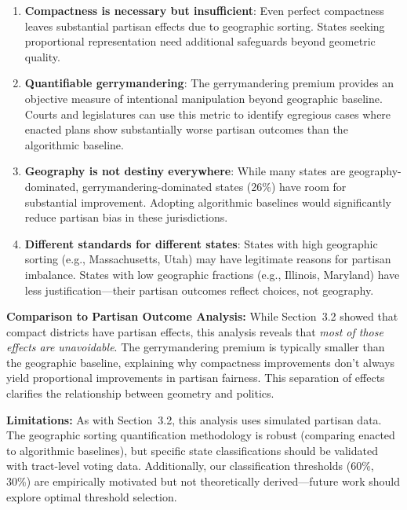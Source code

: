 \begin{enumerate}
    \item \textbf{Compactness is necessary but insufficient}: Even perfect compactness leaves substantial partisan effects due to geographic sorting. States seeking proportional representation need additional safeguards beyond geometric quality.

    \item \textbf{Quantifiable gerrymandering}: The gerrymandering premium provides an objective measure of intentional manipulation beyond geographic baseline. Courts and legislatures can use this metric to identify egregious cases where enacted plans show substantially worse partisan outcomes than the algorithmic baseline.

    \item \textbf{Geography is not destiny everywhere}: While many states are geography-dominated, gerrymandering-dominated states (26\%) have room for substantial improvement. Adopting algorithmic baselines would significantly reduce partisan bias in these jurisdictions.

    \item \textbf{Different standards for different states}: States with high geographic sorting (e.g., Massachusetts, Utah) may have legitimate reasons for partisan imbalance. States with low geographic fractions (e.g., Illinois, Maryland) have less justification—their partisan outcomes reflect choices, not geography.
\end{enumerate}

\textbf{Comparison to Partisan Outcome Analysis:} While Section~3.2 showed that compact districts have partisan effects, this analysis reveals that \textit{most of those effects are unavoidable}. The gerrymandering premium is typically smaller than the geographic baseline, explaining why compactness improvements don't always yield proportional improvements in partisan fairness. This separation of effects clarifies the relationship between geometry and politics.

\textbf{Limitations:} As with Section~3.2, this analysis uses simulated partisan data. The geographic sorting quantification methodology is robust (comparing enacted to algorithmic baselines), but specific state classifications should be validated with tract-level voting data. Additionally, our classification thresholds (60\%, 30\%) are empirically motivated but not theoretically derived—future work should explore optimal threshold selection.

